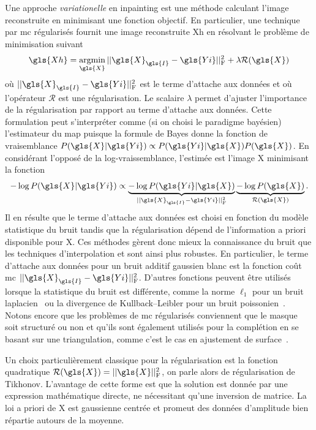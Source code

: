 Une approche \emph{variationelle} en inpainting est une méthode calculant l'image reconstruite en minimisant une fonction objectif. En particulier, une technique par \gls{mc} régularisés fournit une image reconstruite \gls{Xh} en résolvant le problème de minimisation suivant~\cite[Section~6.3]{boyd2004convex}
\begin{equation}\label{eq-MC-regul}
    \gls{Xh} = \argmin_{\gls{X}} \frobnorm{\gls{X}_{\gls{I}} - \gls{Yi}} + \lambda \mathcal{R}(\gls{X})
\end{equation}
où $\frobnorm{\gls{X}_{\gls{I}} - \gls{Yi}}$ est le terme d'attache aux données et où l'opérateur $\mathcal{R}$ est une régularisation. Le scalaire $\lambda$ permet d'ajuster l'importance de la régularisation par rapport au terme d'attache aux données. Cette formulation peut s'interpréter comme (si on choisi le paradigme bayésien) l'estimateur du \gls{map} puisque la formule de Bayes donne la fonction de vraisemblance $P(\gls{X}|\gls{Yi}) \propto P(\gls{Yi}|\gls{X}) P(\gls{X})$. En considérant l'opposé de la log-vraissemblance, l'estimée est l'image \gls{X} minimisant la fonction
\begin{equation}
    -\log P(\gls{X}|\gls{Yi}) \propto
    \underbrace{-\log P(\gls{Yi}|\gls{X})}_{\frobnorm{\gls{X}_{\gls{I}} - \gls{Yi}}}
    \underbrace{- \log P(\gls{X})}_{\mathcal{R}(\gls{X})}.
\end{equation}
Il en résulte que le terme d'attache aux données est choisi en fonction du modèle statistique du bruit tandis que la régularisation dépend de l'information a priori disponible pour \gls{X}. Ces méthodes gèrent donc mieux la connaissance du bruit que les techniques d'interpolation et sont ainsi plus robustes. En particulier, le terme d'attache aux données pour un bruit additif gaussien blanc est la fonction coût \gls{mc} $\frobnorm{\gls{X}_{\gls{I}} - \gls{Yi}}$. D'autres fonctions peuvent être utilisés lorsque la statistique du bruit est différente, comme la norme $\ell_1$ pour un bruit laplacien~\cite{frecon2017bayesian} ou la divergence de Kullback–Leibler pour un bruit poissonien~\cite{ono2013poisson}. Notons encore que les problèmes de \gls{mc} régularisés conviennent que le masque soit structuré ou non et qu'ils sont également utilisés pour la complétion en se basant sur une triangulation, comme c'est le cas en ajustement de surface~\cite{zhong2016surface,cazals2006delaunay}.

Un choix particulièrement classique pour la régularisation est la fonction quadratique $\mathcal{R}(\gls{X}) = \frobnorm{\gls{X}}$, on parle alors de régularisation de Tikhonov. L'avantage de cette forme est que la solution est  donnée par une expression mathématique directe, ne nécessitant qu'une inversion de matrice. La loi a priori de \gls{X} est gaussienne centrée et promeut des données d'amplitude bien répartie autours de la moyenne.

